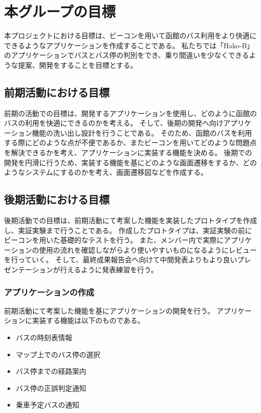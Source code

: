 \documentclass[openany,11pt,papersize]{jsbook}
\begin{document}
\section{本グループの目標}
本プロジェクトにおける目標は、ビーコンを用いて函館のバス利用をより快適にできるようなアプリケーションを作成することである。
私たちでは「Hako-B」のアプリケーションでバスとバス停の判別をでき、乗り間違いを少なくできるような提案、開発をすることを目標とする。


\subsection{前期活動における目標}
前期の活動での目標は、開発するアプリケーションを使用し、どのように函館のバスの利用を快適にできるのかを考える。
そして、後期の開発へ向けアプリケーション機能の洗い出し設計を行うことである。
そのため、函館のバスを利用する際にどのような点が不便であるか、またビーコンを用いてどのような問題点を解決できるかを考え、アプリケーションに実装する機能を決める。
後期での開発を円滑に行うため、実装する機能を基にどのような画面遷移をするか、どのようなシステムにするのかを考え、画面遷移図などを作成する。


\subsection{後期活動における目標}
後期活動での目標は、前期活動にて考案した機能を実装したプロトタイプを作成し、実証実験まで行うことである。
作成したプロトタイプは、実証実験の前にビーコンを用いた基礎的なテストを行う。
また、メンバー内で実際にアプリケーションの使用の流れを確認しながらより使いやすいものになるようにレビューを行っていく。
そして、最終成果報告会へ向けて中間発表よりもより良いプレゼンテーションが行えるように発表練習を行う。


\subsubsection{アプリケーションの作成}
前期活動にて考案した機能を基にアプリケーションの開発を行う。
アプリケーションに実装する機能は以下のものである。
\begin{itemize}

\item バスの時刻表情報
\item マップ上でのバス停の選択
\item バス停までの経路案内
\item バス停の正誤判定通知
\item 乗車予定バスの通知

\end{itemize}
\end{document}
